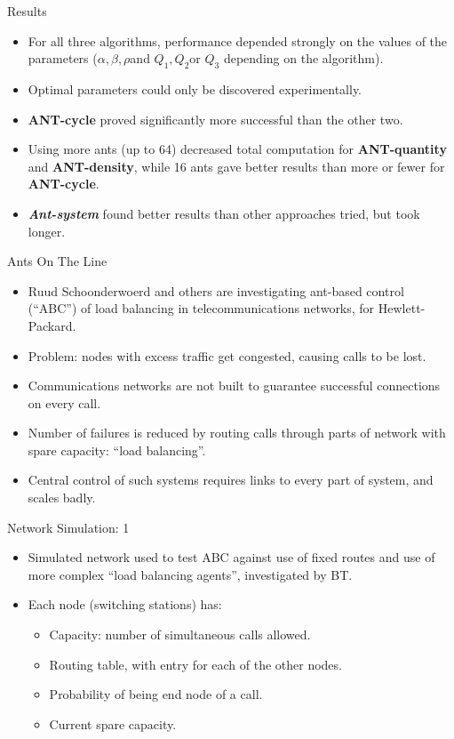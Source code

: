 \documentclass{article}
\begin{document}
\begin{slide}{}
{\Large Results}
\begin{itemize}
\item For all three algorithms, performance depended strongly on the
values of the parameters ($\alpha, \beta, \rho$\space and $Q_1,Q_2$\space or $Q_3$
depending on the algorithm).
\item Optimal parameters could only be discovered experimentally.
\item {\bf ANT-cycle} proved significantly more successful than the
other two.
\item Using more ants (up to 64) decreased total computation for {\bf
ANT-quantity} and {\bf ANT-density}, while
16 ants gave better results than more or fewer for {\bf ANT-cycle}.
\item {\bf {\em Ant-system}} found better results than other approaches
tried, but took longer.
\end{itemize}
\end{slide}

\begin{slide}{}
{\Large Ants On The Line}
\begin{itemize}
\item Ruud Schoonderwoerd and others are investigating ant-based
control (``ABC'') of load balancing in telecommunications networks, for
Hewlett-Packard.
\item Problem: nodes with excess traffic get congested, causing calls
to be lost.
\item Communications networks are not built to guarantee successful
connections on every call.
\item Number of failures is reduced by routing calls through parts of
network with spare capacity: ``load balancing''.
\item Central control of such systems requires links to every part of
system, and scales badly.
\end{itemize}
\end{slide}

\begin{slide}{}
{\Large Network Simulation: 1}
\begin{itemize}
\item Simulated network used to test ABC against use of fixed routes
and use of more complex ``load balancing agents'', investigated by BT.
\item Each node (switching stations) has:
\begin{itemize}
\item Capacity: number of simultaneous calls allowed.
\item Routing table, with entry for each of the other nodes.
\item Probability of being end node of a call.
\item Current spare capacity.
\end{itemize}
\end{itemize}
\end{slide}
\end{document}
